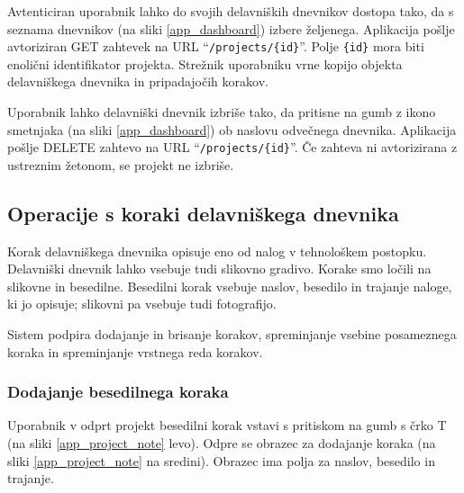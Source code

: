 \documentclass[a4paper, 12pt]{book}
\begin{document}
Avtenticiran uporabnik lahko do svojih delavniških dnevnikov dostopa tako, da s seznama dnevnikov (na sliki \ref{app_dashboard}) izbere željenega.
Aplikacija pošlje avtoriziran GET zahtevek na URL \enquote{\texttt{/projects/\{id\}}}.
Polje \texttt{\{id\}} mora biti enolični identifikator projekta.
Strežnik uporabniku vrne kopijo objekta delavniškega dnevnika in pripadajočih korakov.


Uporabnik lahko delavniški dnevnik izbriše tako, da pritisne na gumb z ikono smetnjaka (na sliki \ref{app_dashboard}) ob naslovu odvečnega dnevnika.
Aplikacija pošlje DELETE zahtevo na URL \enquote{\texttt{/projects/\{id\}}}.
Če zahteva ni avtorizirana z ustreznim žetonom, se projekt ne izbriše.



\subsection{Operacije s koraki delavniškega dnevnika}

Korak delavniškega dnevnika opisuje eno od nalog v tehnološkem postopku.
Delavniški dnevnik lahko vsebuje tudi slikovno gradivo.
Korake smo ločili na slikovne in besedilne.
Besedilni korak vsebuje naslov, besedilo in trajanje naloge, ki jo opisuje; slikovni pa vsebuje tudi fotografijo.

Sistem podpira dodajanje in brisanje korakov, spreminjanje vsebine posameznega koraka in spreminjanje vrstnega reda korakov.


\subsubsection{Dodajanje besedilnega koraka}

Uporabnik v odprt projekt besedilni korak vstavi s pritiskom na gumb s črko T (na sliki \ref{app_project_note} levo).
Odpre se obrazec za dodajanje koraka (na sliki \ref{app_project_note} na sredini).
Obrazec ima polja za naslov, besedilo in trajanje.
\end{document}
